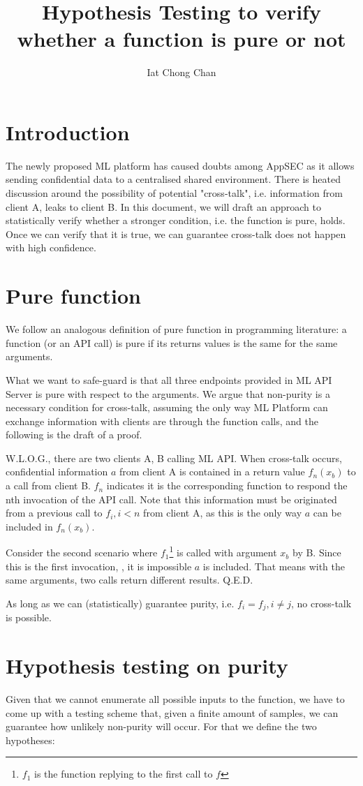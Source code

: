 \documentclass[]{article}
\title{Hypothesis Testing to verify whether a function is pure or not}
\author{Iat Chong Chan}
\begin{document}
\section{Introduction}
The newly proposed ML platform has caused doubts among AppSEC as it allows 
sending confidential data to a centralised shared environment. There is heated 
discussion around the possibility of potential "cross-talk", i.e. information 
from client A, leaks to client B. In this document, we will draft an approach 
to statistically verify whether a stronger condition, i.e. the function 
is pure, holds. Once we can verify that it is true, we can guarantee cross-talk 
does not happen with high confidence.

\section{Pure function}
We follow an analogous definition of pure function in programming literature: a 
function (or an API call) is pure if its returns values is the same for the 
same arguments. 

What we want to safe-guard is that all three endpoints provided in ML API 
Server is pure with respect to the arguments. We argue that non-purity is a 
necessary condition for cross-talk, assuming the only way ML Platform can 
exchange information with clients are through the function calls, and the 
following 
is the draft of a proof.

W.L.O.G., there are two clients A, B calling ML API. When cross-talk 
occurs, confidential information $a$ from client A is contained in 
a return value $f_n(x_b)$ to a call from client B. $f_n$ indicates it is the 
corresponding function to respond the nth invocation of the API call. Note that 
this information must be originated from a previous call to $f_i, i < n$ from 
client 
A, as this is the only way $a$ can be included in $f_n(x_b)$. 

Consider the second scenario where $f_1$\footnote{$f_1$ is the function 
replying to the first call to $f$} is called with argument $x_b$ by B. 
Since this is the first invocation, , it is impossible $a$ is included. That 
means with the same arguments, two calls return different results. Q.E.D.

As long as we can (statistically) guarantee purity, i.e. $f_i = f_j, i \neq j$, 
no cross-talk is possible.

\section{Hypothesis testing on purity}
Given that we cannot enumerate all possible inputs to the function, we have to 
come up with a testing scheme that, given a finite amount of samples, we can 
guarantee how unlikely non-purity will occur. For that we define the two 
hypotheses:
\end{document}
